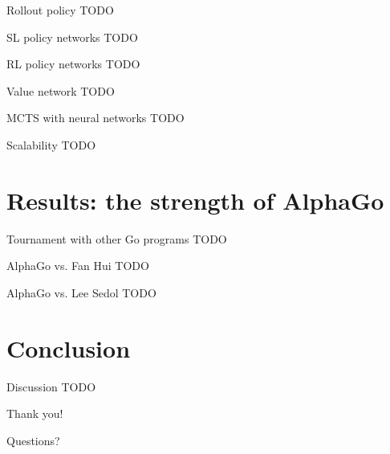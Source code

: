 \documentclass{beamer}
\newcommand{\todo}{\alert{TODO}}
\begin{document}
  \begin{frame}{Rollout policy}
    \todo
  \end{frame}

  \begin{frame}{SL policy networks}
    \todo
  \end{frame}

  \begin{frame}{RL policy networks}
    \todo
  \end{frame}

  \begin{frame}{Value network}
    \todo
  \end{frame}

  \begin{frame}{MCTS with neural networks}
    \todo
  \end{frame}

  \begin{frame}{Scalability}
    \todo
  \end{frame}


  \section{Results: the strength of AlphaGo}

  \begin{frame}{Tournament with other Go programs}
    \todo
  \end{frame}

  \begin{frame}{AlphaGo vs. Fan Hui}
    \todo
  \end{frame}

  \begin{frame}{AlphaGo vs. Lee Sedol}
    \todo
  \end{frame}


  \section{Conclusion}

  \begin{frame}{Discussion}
    \todo
  \end{frame}

  \begin{frame}[standout]
    \begin{center}
      Thank you!
      \pause

      Questions?
    \end{center}
  \end{frame}
\end{document}

